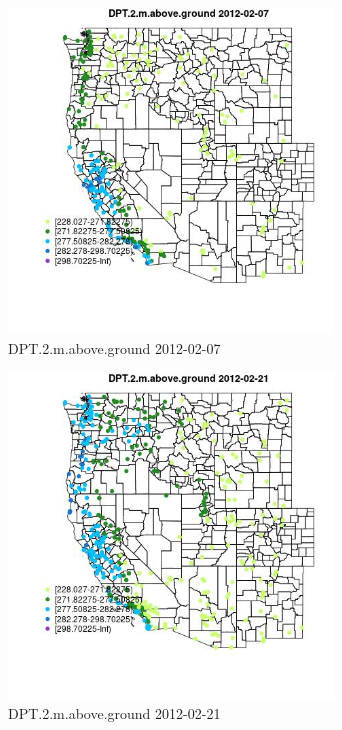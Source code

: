 \begin{figure} 
\centering  
\includegraphics[width=0.77\textwidth]{Code_Outputs/Report_ML_input_PM25_Step4_part_f_de_duplicated_aves_prioritize_24hr_obswNAs_MapObsDPT2maboveground2012-02-07.jpg} 
\caption{\label{fig:Report_ML_input_PM25_Step4_part_f_de_duplicated_aves_prioritize_24hr_obswNAsMapObsDPT2maboveground2012-02-07}DPT.2.m.above.ground 2012-02-07} 
\end{figure} 
 

\clearpage 

\begin{figure} 
\centering  
\includegraphics[width=0.77\textwidth]{Code_Outputs/Report_ML_input_PM25_Step4_part_f_de_duplicated_aves_prioritize_24hr_obswNAs_MapObsDPT2maboveground2012-02-21.jpg} 
\caption{\label{fig:Report_ML_input_PM25_Step4_part_f_de_duplicated_aves_prioritize_24hr_obswNAsMapObsDPT2maboveground2012-02-21}DPT.2.m.above.ground 2012-02-21} 
\end{figure} 
 

